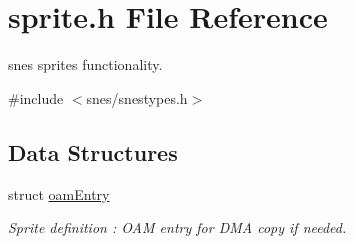 \hypertarget{a00365}{}\section{sprite.\+h File Reference}
\label{a00365}


snes sprites functionality.  


{\ttfamily \#include $<$snes/snestypes.\+h$>$}\newline
\subsection*{Data Structures}
\begin{DoxyCompactItemize}
\item 
struct \hyperlink{a00401}{oam\+Entry}
\begin{DoxyCompactList}\small\item\em Sprite definition \+: O\+AM entry for D\+MA copy if needed. \end{DoxyCompactList}\end{DoxyCompactItemize}
